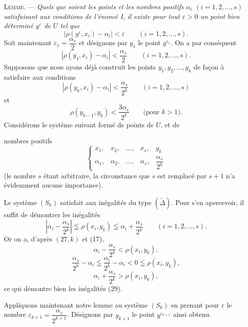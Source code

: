 \documentclass[a4paper,12pt]{amsart}
\newcommand{\srcpage}[1]{} %
\begin{document}
\textsc{Lemme.} --- \textit{Quels que soient les points et les nombres positifs $\alpha_i$ $(i=1,2,\dots,s)$ satisfaisant aux conditions de l'énoncé I, il existe pour tout $\varepsilon>0$ un point bien déterminé $y^\varepsilon$ de $U$ tel que}
\begin{equation}\tag{26}
|\rho(y^\varepsilon,x_i)-\alpha_i|<\varepsilon\qquad(i=1,2,\dots,s).
\end{equation}
Soit maintenant $\varepsilon_1=\dfrac{\alpha_s}{2}$ et désignons par $y_1$ le point $y^{\varepsilon_1}$. On a par conséquent
\begin{equation}\tag{27, 1}
|\rho(y_1,x_i)-\alpha_i|<\frac{\alpha_s}{2}\qquad(i=1,2,\dots,s).
\end{equation}
Supposons que nous ayons déjà construit les points $y_1,y_2,\dots,y_k$ de façon à satisfaire aux conditions
\begin{equation}\tag{27, $k$}
|\rho(y_k,x_i)-\alpha_i|<\frac{\alpha_s}{2^k}\qquad(i=1,2,\dots,s)
\end{equation}
et
\begin{equation}\tag{28, $k$}
\rho(y_{k-1},y_k)<\frac{3\alpha_s}{2^k}\qquad\text{(pour $k>1$).}
\end{equation}
Considérons le système suivant formé de points de $U$, et de
\srcpage{62}
nombres positifs
\begin{equation}\tag{$S_k$}
\left\{\begin{array}{ccccc}
x_1,&x_2,&\dots,&x_s,&y_k\\[4pt]
\alpha_1,&\alpha_2,&\dots,&\alpha_s,&\dfrac{\alpha_s}{2^k}
\end{array}\right.
\end{equation}
(le nombre $s$ étant arbitraire, la circonstance que $s$ est remplacé par $s+1$ n'a évidemment aucune importance).

Le système $(S_k)$ satisfait aux inégalités du type $(\widetilde{\Delta})$. Pour s'en apercevoir, il suffit de démontrer les inégalités
\begin{equation}\tag{29}
\left|\alpha_i-\frac{\alpha_s}{2^k}\right|\leqq\rho(x_i,y_k)
\leqq\alpha_i+\frac{\alpha_s}{2^k}\qquad(i=1,2,\dots,s).
\end{equation}
Or on a, d'après $(27,k)$ et (17),
\[
\alpha_i-\frac{\alpha_s}{2^k}<\rho(x_i,y_k),
\]
\[
\frac{\alpha_s}{2^k}-\alpha_i\leqq\frac{\alpha_i}{2^k}-\alpha_i<0\leqq\rho(x_i,y_k),
\]
\[
\alpha_i+\frac{\alpha_s}{2^k}>\rho(x_i,y_k),
\]
ce qui démontre bien les inégalités (29).

Appliquons maintenant notre lemme au système $(S_k)$ en prenant pour $\varepsilon$ le nombre $\varepsilon_{k+1}=\dfrac{\alpha_s}{2^{k+1}}$. Désignons par $y_{k+1}$ le point $y^{\varepsilon_{k+1}}$ ainsi obtenu.
\end{document}
